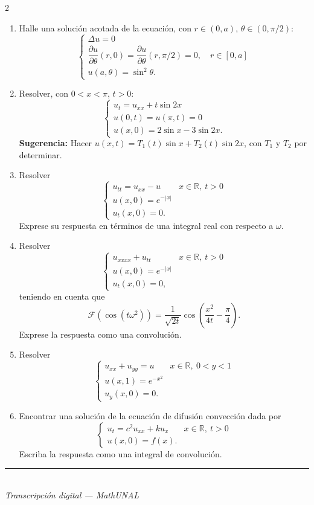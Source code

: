 \documentclass[11pt]{article}
\newcommand{\examfooter}{%
  \vfill
  \rule{\linewidth}{0.4pt}\\[1pt]
  {\scriptsize\textit{Transcripci\'on digital --- MathUNAL}\hfill\textcolor{unalblue}{\textbf{\thepage}}}
}
\begin{document}
\begin{multicols}{2}
\begin{enumerate}
\item Halle una solución acotada de la ecuación, con $r\in(0,a)$, $\theta\in(0,\pi/2)$:
\[
\begin{cases}
\Delta u = 0 \\
\dfrac{\partial u}{\partial\theta}(r,0) = \dfrac{\partial u}{\partial\theta}(r,\pi/2) = 0, \quad r\in[0,a] \\
u(a,\theta) = \sin^2\theta.
\end{cases}
\]

\item Resolver, con $0<x<\pi$, $t>0$:
\[
\begin{cases}
u_t = u_{xx} + t\sin 2x \\
u(0,t) = u(\pi,t) = 0 \\
u(x,0) = 2\sin x - 3\sin 2x.
\end{cases}
\]
\textbf{Sugerencia:} Hacer $u(x,t) = T_1(t)\sin x + T_2(t)\sin 2x$, con $T_1$ y $T_2$ por determinar.

\item Resolver
\[
\begin{cases}
u_{tt} = u_{xx} - u & x\in\mathbb{R},\ t>0 \\
u(x,0) = e^{-|x|} \\
u_t(x,0) = 0.
\end{cases}
\]
Exprese su respuesta en términos de una integral real con respecto a $\omega$.

\item Resolver
\[
\begin{cases}
u_{xxxx}+u_{tt} & x\in\mathbb{R},\ t>0 \\
u(x,0) = e^{-|x|} \\
u_t(x,0) = 0,
\end{cases}
\]
teniendo en cuenta que
\[
\mathcal{F}(\cos(t\omega^2)) = \frac{1}{\sqrt{2t}}\cos\left(\frac{x^2}{4t}-\frac{\pi}{4}\right).
\]
Exprese la respuesta como una convolución.

\item Resolver
\[
\begin{cases}
u_{xx}+u_{yy}=u & x\in\mathbb{R},\ 0<y<1 \\
u(x,1) = e^{-x^2} \\
u_y(x,0) = 0.
\end{cases}
\]

\item Encontrar una solución de la ecuación de difusión convección dada por
\[
\begin{cases}
u_t = c^2 u_{xx} + k u_x & x\in\mathbb{R},\ t>0 \\
u(x,0) = f(x).
\end{cases}
\]
Escriba la respuesta como una integral de convolución.
\end{enumerate}
\end{multicols}

\examfooter
\end{document}
